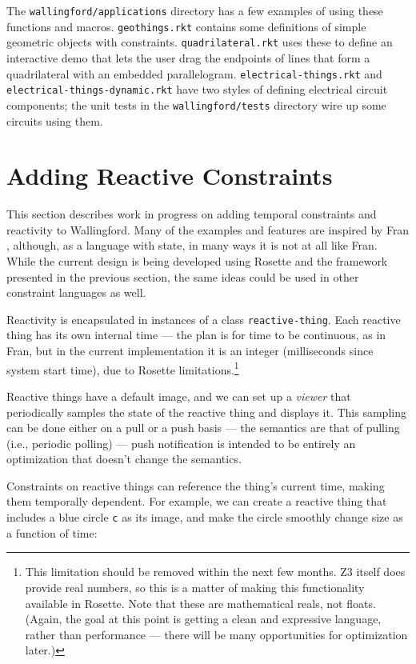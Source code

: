 \documentclass{sig-alternate-05-2015}
\begin{document}
The \verb|wallingford/applications| directory has a few examples of using
these functions and macros.  \verb|geothings.rkt| contains some definitions
of simple geometric objects with constraints. \verb|quadrilateral.rkt| uses
these to define an interactive demo that lets the user drag the endpoints
of lines that form a quadrilateral with an embedded parallelogram.
\verb|electrical-things.rkt| and \verb|electrical-things-dynamic.rkt| have
two styles of defining electrical circuit components; the unit tests in the
\verb|wallingford/tests| directory wire up some circuits using them.

\section{Adding Reactive Constraints}
\label{sec:reactive}

This section describes work in progress on adding temporal constraints and
reactivity to Wallingford.  Many of the examples and features are inspired
by Fran \cite{elliot-icfp-1997}, although, as a language with state, in
many ways it is not at all like Fran.  While the current design is being
developed using Rosette and the framework presented in the previous
section, the same ideas could be used in other constraint languages as
well.

Reactivity is encapsulated in instances of a class \verb|reactive-thing|.
Each reactive thing has its own internal time --- the plan is for time to
be continuous, as in Fran, but in the current implementation it is an
integer (milliseconds since system start time), due to Rosette
limitations.\footnote{This limitation should be removed within the next few
  months.  Z3 itself does provide real numbers, so this is a matter of
  making this functionality available in Rosette.  Note that these are
  mathematical reals, not floats.  (Again, the goal at this point is
  getting a clean and expressive language, rather than performance ---
  there will be many opportunities for optimization later.)}

Reactive things have a default image, and we can set up a \emph{viewer}
that periodically samples the state of the reactive thing and displays it.
This sampling can be done either on a pull or a push basis --- the
semantics are that of pulling (i.e., periodic polling) --- push
notification is intended to be entirely an optimization that doesn't change
the semantics.

Constraints on reactive things can reference the thing's current time,
making them temporally dependent.  For example, we can create a reactive
thing that includes a blue circle \verb|c| as its image, and make the
circle smoothly change size as a function of time:
\end{document}
